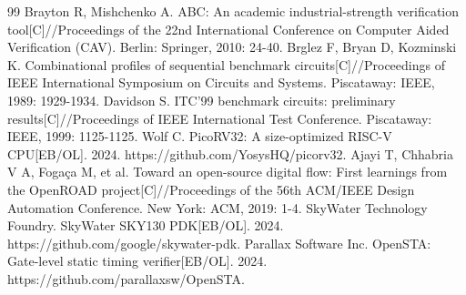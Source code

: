 \documentclass[twocolumn,10pt,fontset=windows]{ctexart}
\begin{document}
\begin{thebibliography}{99}
 Brayton R, Mishchenko A. ABC: An academic industrial-strength verification tool[C]//Proceedings of the 22nd International Conference on Computer Aided Verification (CAV). Berlin: Springer, 2010: 24-40.
 Brglez F, Bryan D, Kozminski K. Combinational profiles of sequential benchmark circuits[C]//Proceedings of IEEE International Symposium on Circuits and Systems. Piscataway: IEEE, 1989: 1929-1934.
 Davidson S. ITC'99 benchmark circuits: preliminary results[C]//Proceedings of IEEE International Test Conference. Piscataway: IEEE, 1999: 1125-1125.
 Wolf C. PicoRV32: A size-optimized RISC-V CPU[EB/OL]. 2024. https://github.com/YosysHQ/picorv32.
 Ajayi T, Chhabria V A, Fogaça M, et al. Toward an open-source digital flow: First learnings from the OpenROAD project[C]//Proceedings of the 56th ACM/IEEE Design Automation Conference. New York: ACM, 2019: 1-4.
 SkyWater Technology Foundry. SkyWater SKY130 PDK[EB/OL]. 2024. https://github.com/google/skywater-pdk.
 Parallax Software Inc. OpenSTA: Gate-level static timing verifier[EB/OL]. 2024. https://github.com/parallaxsw/OpenSTA.
\end{thebibliography}
\end{document}
